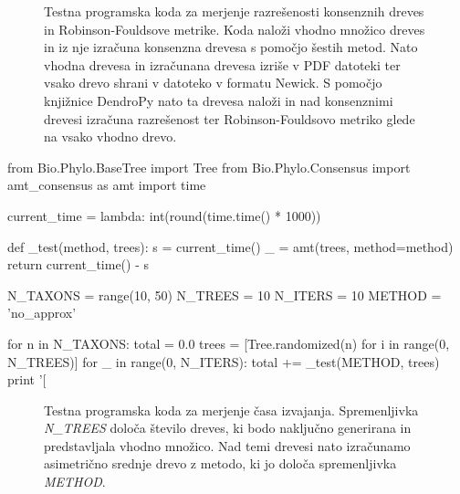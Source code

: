 \documentclass[a4paper, 12pt]{book}
\begin{document}
\begin{figure}[h!]
	\label{app-code-metrics}
	\footnotesize
	{
	\caption{
		Testna programska koda za merjenje razrešenosti konsenznih dreves in Robinson-Fouldsove metrike.
		Koda naloži vhodno množico dreves in iz nje izračuna konsenzna drevesa s pomočjo šestih metod. 
		Nato vhodna drevesa in izračunana drevesa izriše v PDF datoteki ter vsako drevo shrani v datoteko 
		v formatu Newick. S pomočjo knjižnice DendroPy nato ta drevesa naloži in nad konsenznimi drevesi 
		izračuna razrešenost ter Robinson-Fouldsovo metriko glede na vsako vhodno drevo.
	}
	}
\end{figure}
\clearpage
\begin{python}
from Bio.Phylo.BaseTree import Tree
from Bio.Phylo.Consensus import amt_consensus as amt
import time

current_time = lambda: int(round(time.time() * 1000))


def _test(method, trees):
    s = current_time()
    _ = amt(trees, method=method)
    return current_time() - s

N_TAXONS = range(10, 50)
N_TREES = 10
N_ITERS = 10
METHOD = 'no_approx'

for n in N_TAXONS:
    total = 0.0
    trees = [Tree.randomized(n) for i in range(0, N_TREES)]
    for _ in range(0, N_ITERS):
        total += _test(METHOD, trees)
    print '[%
\end{python}
\begin{figure}[h!]
	\label{app-code-time}
	\footnotesize
	{
	\caption{
		Testna programska koda za merjenje časa izvajanja. Spremenljivka {\it N\_TREES} določa število dreves,
		ki bodo naključno generirana in predstavljala vhodno množico. Nad temi drevesi nato izračunamo 
		asimetrično srednje drevo z metodo, ki jo določa spremenljivka {\it METHOD}.  
	}
	}
\end{figure}
\end{document}
